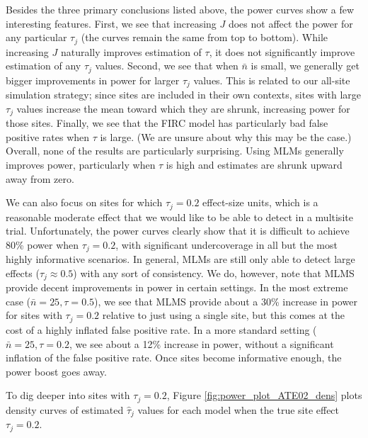 \documentclass[]{article}
\begin{document}
Besides the three primary conclusions listed above, the power curves show a few interesting features.
First, we see that increasing $J$ does not affect the power for any particular $\tau_j$ (the curves remain the same from top to bottom).
While increasing $J$ naturally improves estimation of $\tau$, it does not significantly improve estimation of any $\tau_j$ values.
Second, we see that when $\bar{n}$ is small, we generally get bigger improvements in power for larger $\tau_j$ values.
This is related to our all-site simulation strategy; since sites are included in their own contexts, sites with large $\tau_j$ values increase the mean toward which they are shrunk, increasing power for those sites.
Finally, we see that the FIRC model has particularly bad false positive rates when $\tau$ is large.
(We are unsure about why this may be the case.)
Overall, none of the results are particularly surprising.
Using MLMs generally improves power, particularly when $\tau$ is high and estimates are shrunk upward away from zero.

We can also focus on sites for which $\tau_j = 0.2$ effect-size units, which is a reasonable moderate effect that we would like to be able to detect in a multisite trial.
Unfortunately, the power curves clearly show that it is difficult to achieve 80\% power when $\tau_j = 0.2$, with significant undercoverage in all but the most highly informative scenarios.
In general, MLMs are still only able to detect large effects ($\tau_j \approx 0.5$) with any sort of consistency.
We do, however, note that MLMS provide decent improvements in power in certain settings.
In the most extreme case ($\bar{n} = 25, \tau = 0.5$), we see that MLMS provide about a 30\% increase in power for sites with $\tau_j = 0.2$ relative to just using a single site, but this comes at the cost of a highly inflated false positive rate.
In a more standard setting ($\bar{n} = 25, \tau = 0.2$, we see about a 12\% increase in power, without a significant inflation of the false positive rate.
Once sites become informative enough, the power boost goes away.

To dig deeper into sites with $\tau_j = 0.2$, Figure \ref{fig:power_plot_ATE02_dens} plots density curves of estimated $\hat{\tau}_j$ values for each model when the true site effect $\tau_j = 0.2$.
\end{document}
